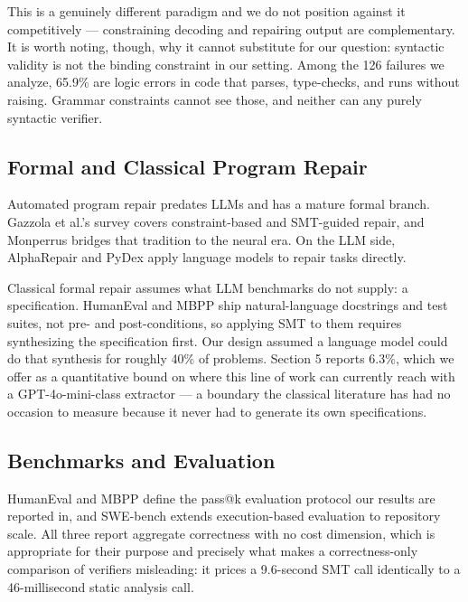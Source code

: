 This is a genuinely different paradigm and we do not position against it competitively --- constraining decoding and repairing output are complementary. It is worth noting, though, why it cannot substitute for our question: syntactic validity is not the binding constraint in our setting. Among the 126 failures we analyze, 65.9\% are logic errors in code that parses, type-checks, and runs without raising. Grammar constraints cannot see those, and neither can any purely syntactic verifier.

\subsection{Formal and Classical Program Repair}

Automated program repair predates LLMs and has a mature formal branch. Gazzola et al.'s survey \cite{Gazzola2019Survey} covers constraint-based and SMT-guided repair, and Monperrus \cite{Monperrus2023Introduction} bridges that tradition to the neural era. On the LLM side, AlphaRepair \cite{Xia2022AlphaRepair} and PyDex \cite{Zhang2023PyDex} apply language models to repair tasks directly.

Classical formal repair assumes what LLM benchmarks do not supply: a specification. HumanEval and MBPP ship natural-language docstrings and test suites, not pre- and post-conditions, so applying SMT to them requires synthesizing the specification first. Our design assumed a language model could do that synthesis for roughly 40\% of problems. Section 5 reports 6.3\%, which we offer as a quantitative bound on where this line of work can currently reach with a GPT-4o-mini-class extractor --- a boundary the classical literature has had no occasion to measure because it never had to generate its own specifications.

\subsection{Benchmarks and Evaluation}

HumanEval \cite{Chen2021Evaluating} and MBPP \cite{Austin2021Program} define the pass@k evaluation protocol our results are reported in, and SWE-bench \cite{Jimenez2023SWEbench} extends execution-based evaluation to repository scale. All three report aggregate correctness with no cost dimension, which is appropriate for their purpose and precisely what makes a correctness-only comparison of verifiers misleading: it prices a 9.6-second SMT call identically to a 46-millisecond static analysis call.

